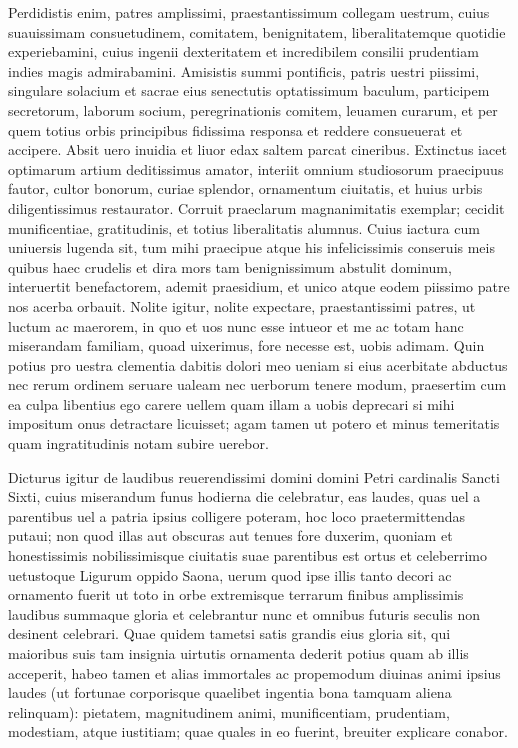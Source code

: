 \documentclass[a5paper,twoside]{article}
\begin{document}
Perdidistis enim, patres amplissimi, praestantissimum collegam uestrum, cuius suauissimam consuetudinem, comitatem, benignitatem, liberalitatemque quotidie experiebamini, cuius ingenii dexteritatem et incredibilem consilii prudentiam indies magis admirabamini. Amisistis summi pontificis, patris uestri piissimi, singulare solacium et sacrae eius senectutis optatissimum baculum, participem secretorum, laborum socium, peregrinationis comitem, leuamen curarum, et per quem totius orbis principibus fidissima responsa et reddere consueuerat et accipere. Absit uero inuidia et liuor edax saltem parcat cineribus. Extinctus iacet optimarum artium deditissimus amator, interiit omnium studiosorum praecipuus fautor, cultor bonorum, curiae splendor, ornamentum ciuitatis, et huius urbis diligentissimus restaurator. Corruit praeclarum magnanimitatis exemplar; cecidit munificentiae, gratitudinis, et totius liberalitatis alumnus. Cuius iactura cum uniuersis lugenda sit, tum mihi praecipue atque his infelicissimis conseruis meis quibus haec crudelis et dira mors tam benignissimum abstulit dominum, interuertit benefactorem, ademit praesidium, et unico atque eodem piissimo patre nos acerba orbauit. Nolite igitur, nolite expectare, praestantissimi patres, ut luctum ac maerorem, in quo et uos nunc esse intueor et me ac totam hanc miserandam familiam, quoad uixerimus, fore necesse est, uobis adimam. Quin potius pro uestra clementia dabitis dolori meo ueniam si eius acerbitate abductus nec rerum ordinem seruare ualeam nec uerborum tenere modum, praesertim cum ea culpa libentius ego carere uellem quam illam a uobis deprecari si mihi impositum onus detractare licuisset; agam tamen ut potero et minus temeritatis quam ingratitudinis notam subire uerebor.

Dicturus igitur de laudibus reuerendissimi domini domini Petri cardinalis Sancti Sixti, cuius miserandum funus hodierna die celebratur, eas laudes, quas uel a parentibus uel a patria ipsius colligere poteram, hoc loco praetermittendas putaui; non quod illas aut obscuras aut tenues fore duxerim, quoniam et honestissimis nobilissimisque ciuitatis suae parentibus est ortus et celeberrimo uetustoque Ligurum oppido Saona, uerum quod ipse illis tanto decori ac ornamento fuerit ut toto in orbe extremisque terrarum finibus amplissimis laudibus summaque gloria et celebrantur nunc et omnibus futuris seculis non desinent celebrari. Quae quidem tametsi satis grandis eius gloria sit, qui maioribus suis tam insignia uirtutis ornamenta dederit potius quam ab illis acceperit, habeo tamen et alias immortales ac propemodum diuinas animi ipsius laudes (ut fortunae corporisque quaelibet ingentia bona tamquam aliena relinquam): pietatem, magnitudinem animi, munificentiam, prudentiam, modestiam, atque iustitiam; quae quales in eo fuerint, breuiter explicare conabor.
\end{document}
